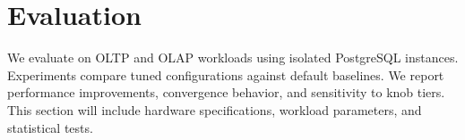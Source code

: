 \section{Evaluation}
We evaluate \sysname on OLTP and OLAP workloads using isolated PostgreSQL instances.
Experiments compare tuned configurations against default baselines.
We report performance improvements, convergence behavior, and sensitivity to knob tiers.
This section will include hardware specifications, workload parameters, and statistical tests.
